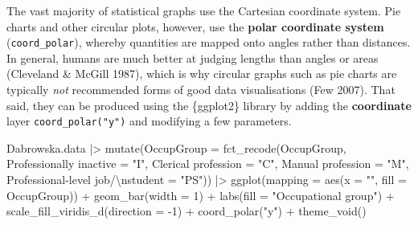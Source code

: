 \documentclass[
  letterpaper,
  DIV=11,
  numbers=noendperiod]{scrreprt}
\newenvironment{Shaded}{\begin{snugshade}}{\end{snugshade}}
\newcommand{\AttributeTok}[1]{\textcolor[rgb]{0.40,0.45,0.13}{#1}}
\newcommand{\DecValTok}[1]{\textcolor[rgb]{0.68,0.00,0.00}{#1}}
\newcommand{\FunctionTok}[1]{\textcolor[rgb]{0.28,0.35,0.67}{#1}}
\newcommand{\NormalTok}[1]{\textcolor[rgb]{0.00,0.23,0.31}{#1}}
\newcommand{\OtherTok}[1]{\textcolor[rgb]{0.00,0.23,0.31}{#1}}
\newcommand{\SpecialCharTok}[1]{\textcolor[rgb]{0.37,0.37,0.37}{#1}}
\newcommand{\StringTok}[1]{\textcolor[rgb]{0.13,0.47,0.30}{#1}}
\begin{document}
The vast majority of statistical graphs use the Cartesian coordinate
system. Pie charts and other circular plots, however, use the
\textbf{polar coordinate system} (\texttt{coord\_polar}), whereby
quantities are mapped onto angles rather than distances. In general,
humans are much better at judging lengths than angles or areas
(Cleveland \& McGill 1987), which is why circular graphs such as pie
charts are typically \emph{not} recommended forms of good data
visualisations (Few 2007). That said, they can be produced using the
\{ggplot2\} library by adding the \textbf{coordinate} layer
\texttt{coord\_polar("y")} and modifying a few parameters.

\begin{Shaded}
\begin{Highlighting}[]
\NormalTok{Dabrowska.data }\SpecialCharTok{|\textgreater{}} 
  \FunctionTok{mutate}\NormalTok{(}\AttributeTok{OccupGroup =} \FunctionTok{fct\_recode}\NormalTok{(OccupGroup,}
                                 \StringTok{\textasciigrave{}}\AttributeTok{Professionally inactive}\StringTok{\textasciigrave{}} \OtherTok{=} \StringTok{"I"}\NormalTok{,}
                                 \StringTok{\textasciigrave{}}\AttributeTok{Clerical profession}\StringTok{\textasciigrave{}} \OtherTok{=} \StringTok{"C"}\NormalTok{,}
                                 \StringTok{\textasciigrave{}}\AttributeTok{Manual profession}\StringTok{\textasciigrave{}} \OtherTok{=} \StringTok{"M"}\NormalTok{,}
                                 \StringTok{\textasciigrave{}}\AttributeTok{Professional{-}level job/}\SpecialCharTok{\textbackslash{}n}\AttributeTok{student}\StringTok{\textasciigrave{}} \OtherTok{=} \StringTok{"PS"}\NormalTok{)) }\SpecialCharTok{|\textgreater{}} 
  \FunctionTok{ggplot}\NormalTok{(}\AttributeTok{mapping =} \FunctionTok{aes}\NormalTok{(}\AttributeTok{x =} \StringTok{""}\NormalTok{, }\AttributeTok{fill =}\NormalTok{ OccupGroup)) }\SpecialCharTok{+}
  \FunctionTok{geom\_bar}\NormalTok{(}\AttributeTok{width =} \DecValTok{1}\NormalTok{) }\SpecialCharTok{+}
  \FunctionTok{labs}\NormalTok{(}\AttributeTok{fill =} \StringTok{"Occupational group"}\NormalTok{) }\SpecialCharTok{+}
  \FunctionTok{scale\_fill\_viridis\_d}\NormalTok{(}\AttributeTok{direction =} \SpecialCharTok{{-}}\DecValTok{1}\NormalTok{) }\SpecialCharTok{+}
  \FunctionTok{coord\_polar}\NormalTok{(}\StringTok{"y"}\NormalTok{) }\SpecialCharTok{+}
  \FunctionTok{theme\_void}\NormalTok{()}
\end{Highlighting}
\end{Shaded}
\end{document}
